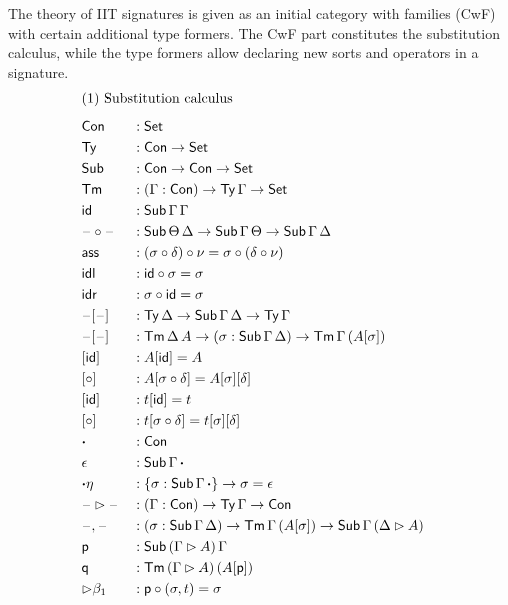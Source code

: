 \documentclass[a4paper,UKenglish,cleveref, autoref]{lipics-v2019}
\begin{document}
The theory of IIT signatures is given as an initial category with families
(CwF)\cite{Dybjer96internaltype} with certain additional type formers. The CwF
part constitutes the substitution calculus, while the type formers allow
declaring new sorts and operators in a signature.
\begin{alignat*}{5}
  & \rlap{(1) Substitution calculus} \\[0.5em]
  & \Con && : \Set \\
  & \Ty  && : \Con\ra\Set \\
  & \Sub  && : \Con\ra\Con\ra\Set \\
  & \Tm  && : (\Gamma:\Con)\ra\Ty\,\Gamma\ra\Set \\
  & \id && : \Sub\,\Gamma\,\Gamma \\
  & \blank\circ\blank && : \Sub\,\Theta\,\Delta\ra\Sub\,\Gamma\,\Theta\ra\Sub\,\Gamma\,\Delta \\
  & \ass && : (\sigma \circ \delta) \circ \nu = \sigma \circ (\delta \circ \nu) \\
  & \idl && : \id\circ\sigma = \sigma \\
  & \idr && : \sigma\circ\id = \sigma \\
  & \blank[\blank] && : \Ty\,\Delta\ra\Sub\,\Gamma\,\Delta\ra\Ty\,\Gamma \\
  & \blank[\blank] && : \Tm\,\Delta\,A\ra(\sigma:\Sub\,\Gamma\,\Delta)\ra\Tm\,\Gamma\,(A[\sigma]) \\
  & [\id] && : A[\id] = A \\
  & [\circ] && : A[\sigma \circ \delta] = A[\sigma][\delta] \\
  & [\id] && : t[\id] = t \\
  & [\circ] && : t[\sigma \circ \delta] = t[\sigma][\delta] \\
  & \boldsymbol{\cdot} && : \Con \\
  & \epsilon && : \Sub\,\Gamma\,\boldsymbol{\cdot} \\
  & {\boldsymbol{\cdot}\eta} && : \{\sigma : \Sub\,\Gamma\,\boldsymbol{\cdot}\} \ra \sigma = \epsilon \\
  & \blank\ext\blank && : (\Gamma:\Con)\ra\Ty\,\Gamma\ra\Con \\
  & \blank,\blank && : (\sigma:\Sub\,\Gamma\,\Delta)\ra\Tm\,\Gamma\,(A[\sigma])\ra\Sub\,\Gamma\,(\Delta\ext A) \\
  & \p && : \Sub\,(\Gamma\ext A)\,\Gamma \\
  & \q && : \Tm\,(\Gamma\ext A)\,(A[\p]) \\
  & {\ext\beta_1} && : \p\circ(\sigma, t) = \sigma \\

\end{alignat*}
\end{document}
